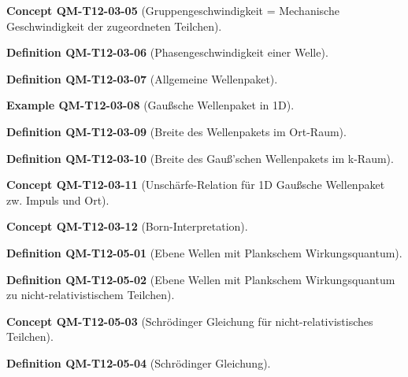 \documentclass[10pt, letterpaper]{article}
\newcommand{\CustomHeading}[3]{%
  \par\medskip\noindent%
  \textbf{#1 #2} \textnormal{(#3)}.\enskip%
}
\newenvironment{DEF}[2]{\CustomHeading{Definition}{#1}{#2}}{}
\newenvironment{EXA}[2]{\CustomHeading{Example}{#1}{#2}}{}
\newenvironment{CONC}[2]{\CustomHeading{Concept}{#1}{#2}}{}
\begin{document}
\begin{CONC}{QM-T12-03-05}{Gruppengeschwindigkeit = Mechanische Geschwindigkeit der zugeordneten Teilchen}
\end{CONC}

\begin{DEF}{QM-T12-03-06}{Phasengeschwindigkeit einer Welle}
\end{DEF}

\begin{DEF}{QM-T12-03-07}{Allgemeine Wellenpaket}
\end{DEF}

\begin{EXA}{QM-T12-03-08}{Gaußsche Wellenpaket in 1D}
\end{EXA}

\begin{DEF}{QM-T12-03-09}{Breite des Wellenpakets im Ort-Raum}
\end{DEF}

\begin{DEF}{QM-T12-03-10}{Breite des Gauß'schen Wellenpakets im k-Raum}
\end{DEF}

\begin{CONC}{QM-T12-03-11}{Unschärfe-Relation für 1D Gaußsche Wellenpaket zw. Impuls und Ort}
\end{CONC}

\begin{CONC}{QM-T12-03-12}{Born-Interpretation}
\end{CONC}

\begin{DEF}{QM-T12-05-01}{Ebene Wellen mit Plankschem Wirkungsquantum}
\end{DEF}

\begin{DEF}{QM-T12-05-02}{Ebene Wellen mit Plankschem Wirkungsquantum zu nicht-relativistischem Teilchen}
\end{DEF}

\begin{CONC}{QM-T12-05-03}{Schrödinger Gleichung für nicht-relativistisches Teilchen}
\end{CONC}

\begin{DEF}{QM-T12-05-04}{Schrödinger Gleichung}
\end{DEF}
\end{document}
